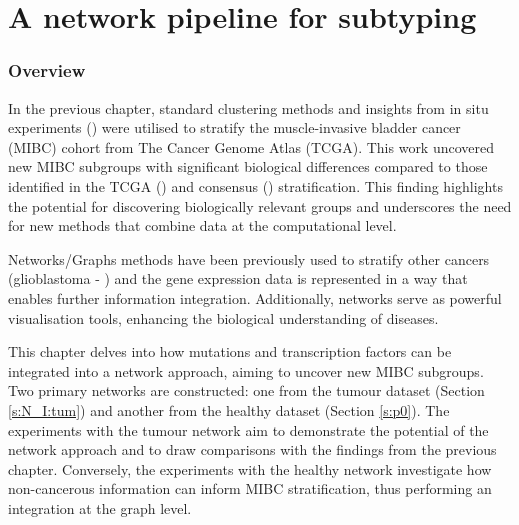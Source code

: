 \chapter{A network pipeline for subtyping} \label{s:N_I}


\vspace{3mm}
\vspace{3mm}


\subsection{Overview}

In the previous chapter, standard clustering methods and insights from in situ experiments (\citet{Baker2022-bj}) were utilised to stratify the muscle-invasive bladder cancer (MIBC) cohort from The Cancer Genome Atlas (TCGA). This work uncovered new MIBC subgroups with significant biological differences compared to those identified in the TCGA (\citet{Robertson2017-mg}) and consensus (\citet{Kamoun2020-tj}) stratification. This finding highlights the potential for discovering biologically relevant groups and underscores the need for new methods that combine data at the computational level.

Networks/Graphs methods have been previously used to stratify other cancers (glioblastoma - \citet{Care2019-ij}) and the gene expression data is represented in a way that enables further information integration. Additionally, networks serve as powerful visualisation tools, enhancing the biological understanding of diseases.

This chapter delves into how mutations and transcription factors can be integrated into a network approach, aiming to uncover new MIBC subgroups. Two primary networks are constructed: one from the tumour dataset (Section \ref{s:N_I:tum}) and another from the healthy dataset (Section \ref{s:p0}). The experiments with the tumour network aim to demonstrate the potential of the network approach and to draw comparisons with the findings from the previous chapter. Conversely, the experiments with the healthy network investigate how non-cancerous information can inform MIBC stratification, thus performing an integration at the graph level.

